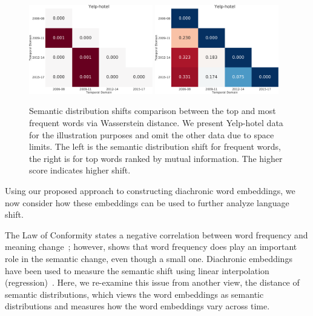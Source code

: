\begin{figure}[tb!]
\centering
\includegraphics[width=0.48\textwidth]{images/chapter3/sm_shift/yelp_hotel_year_freq.pdf}
\includegraphics[width=0.48\textwidth]{images/chapter3/sm_shift/yelp_hotel_year_mi.pdf}
\caption{Semantic distribution shifts comparison between the top and most frequent words via Wasserstein distance. We present Yelp-hotel data for the illustration purposes and omit the other data due to space limits. The left is the semantic distribution shift for frequent words, the right is for top words ranked by mutual information. The higher score indicates higher shift.}
\label{chap3:fig:sm_shift}
\end{figure}

Using our proposed approach to constructing diachronic word embeddings,
we now consider how these embeddings can be used to further analyze language shift.

The Law of Conformity states a negative correlation between word frequency and meaning change~\cite{hamilton2016diachronic}; however, \cite{dubossarsky2017outta} shows that word frequency does play an important role in the semantic change, even though a small one. 
Diachronic embeddings have been used to measure the semantic shift using linear interpolation (regression)~\cite{hamilton2016diachronic}. 
Here, we re-examine this issue from another view, the distance of semantic distributions, which views the word embeddings as semantic distributions and measures how the word embeddings vary across time.

